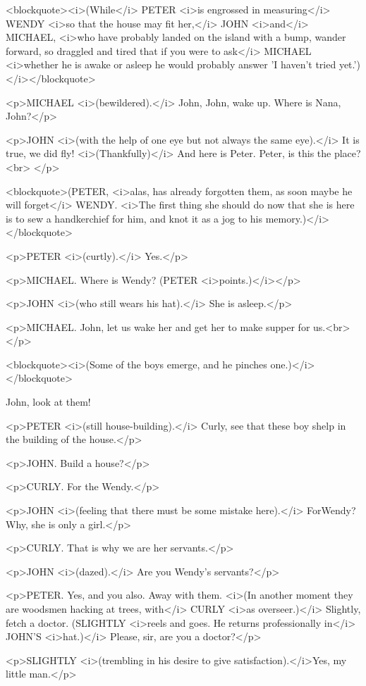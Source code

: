 <blockquote><i>(While</i> PETER <i>is engrossed in measuring</i>
WENDY <i>so that the house may fit her,</i> JOHN <i>and</i> MICHAEL,
<i>who have probably landed on the island with a bump, wander
forward, so draggled and tired that if you were to ask</i> MICHAEL
<i>whether he is awake or asleep he would probably answer 'I haven't
tried yet.')</i></blockquote>

<p>MICHAEL <i>(bewildered).</i> John, John, wake up. Where is Nana,
John?</p>

<p>JOHN <i>(with the help of one eye but not always the same
eye).</i> It is true, we did fly! <i>(Thankfully)</i> And here is
Peter. Peter, is this the place?<br>
</p>

<blockquote>(PETER, <i>alas, has already forgotten them, as soon
maybe he will forget</i> WENDY. <i>The first thing she should do now
that she is here is to sew a handkerchief for him, and knot it as a
jog to his memory.)</i></blockquote>

<p>PETER <i>(curtly).</i> Yes.</p>

<p>MICHAEL. Where is Wendy? (PETER <i>points.)</i></p>

<p>JOHN <i>(who still wears his hat).</i> She is asleep.</p>

<p>MICHAEL. John, let us wake her and get her to make supper for
us.<br>
</p>

<blockquote><i>(Some of the boys emerge, and he pinches
one.)</i></blockquote>

John, look at them! 

<p>PETER <i>(still house-building).</i> Curly, see that these boy
shelp in the building of the house.</p>

<p>JOHN. Build a house?</p>

<p>CURLY. For the Wendy.</p>

<p>JOHN <i>(feeling that there must be some mistake here).</i>
ForWendy? Why, she is only a girl.</p>

<p>CURLY. That is why we are her servants.</p>

<p>JOHN <i>(dazed).</i> Are you Wendy's servants?</p>

<p>PETER. Yes, and you also. Away with them. <i>(In another moment
they are woodsmen hacking at trees, with</i> CURLY <i>as
overseer.)</i> Slightly, fetch a doctor. (SLIGHTLY <i>reels and goes.
He returns professionally in</i> JOHN'S <i>hat.)</i> Please, sir, are
you a doctor?</p>

<p>SLIGHTLY <i>(trembling in his desire to give
satisfaction).</i>Yes, my little man.</p>

